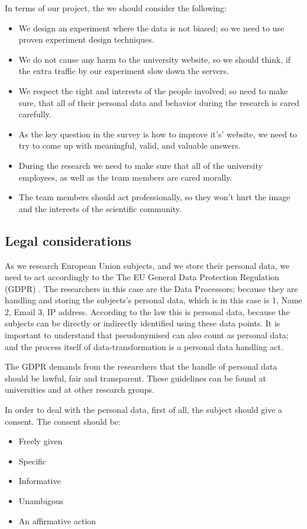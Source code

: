 \documentclass[12pt,a4paper,paper=a4,oneside,titlepage,pdftex]{scrartcl}
\begin{document}
In terms of our project, the we should consider the following:
\begin{itemize}
	\item We design an experiment where the data is not biased; so we need to use proven experiment design techniques.
	\item We do not cause any harm to the university website, so we should think, if the extra traffic by our experiment slow down the servers.
	\item We respect the right and interests of the people involved; so need to make sure, that all of their personal data and behavior during the research is cared carefully.
	\item As the key question in the survey is how to improve it's' website, we need to try to come up with meaningful, valid, and valuable answers.
	\item During the research we need to make sure that all of the university employees, as well as the team members are cared morally.
	\item The team members should act professionally, so they won't hurt the image and the interests of the scientific community.
\end{itemize}

\subsection{Legal considerations}

As we research European Union subjects, and we store their personal data, we need to act accordingly to the The EU General Data Protection Regulation (GDPR) \citep{voigt2017eu}. The researchers in this case are the Data Processors; because they are handling and storing the subjects's personal data, which is in this case is 1, Name 2, Email 3, IP address. According to the law this is personal data, because the subjects can be directly or indirectly identified using these data points. It is important to understand that pseudonymised can also count as personal data; and the process itself of data-transformation is a personal data handling act.

The GDPR demands from the researchers that the handle of personal data should be lawful, fair and transparent. These guidelines can be found at universities and at other research groups.

In order to deal with the personal data, first of all, the subject should give a consent. The consent should be:
\begin{itemize}
	\item Freely given
	\item Specific
	\item Informative
	\item Unambigous
	\item An affirmative action	
\end{itemize}
\end{document}

